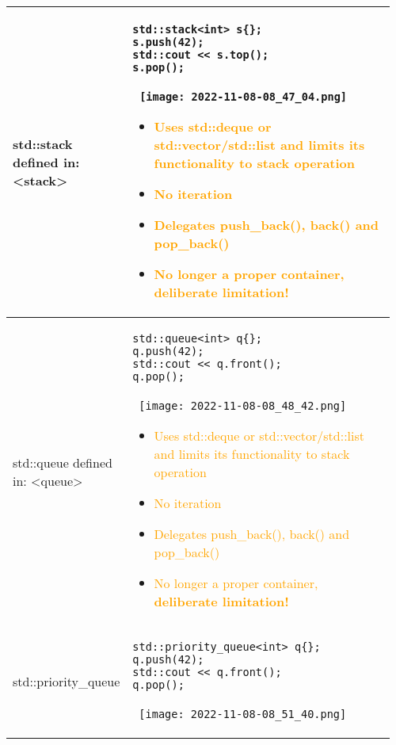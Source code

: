 \documentclass[main.tex,fontsize=8pt,paper=a4,paper=portrait,DIV=calc,]{scrartcl}
\begin{document}
\begin{table}[ht!]
\begin{tabular}{|m{0.2\linewidth}|m{0.755\linewidth}|}
\hline
std::stack \newline 
defined in: <stack> & 
\begin{lstlisting}
std::stack<int> s{};
s.push(42);
std::cout << s.top();
s.pop();
\end{lstlisting}
\, \newline
\texttt{[image: 2022-11-08-08\_47\_04.png]}\newline
\begin{itemize}
\item \textcolor{orange}{Uses std::deque or std::vector/std::list and limits its functionality to stack operation}
\item \textcolor{orange}{No iteration}
\item \textcolor{orange}{Delegates push\_back(), back() and pop\_back()}
\item \textcolor{orange}{No longer a proper container, \textbf{deliberate limitation!}}
\vspace{-2mm}
\end{itemize}\\
\hline
std::queue  \newline 
defined in: <queue> & 
\begin{lstlisting}
std::queue<int> q{};
q.push(42);
std::cout << q.front();
q.pop();
\end{lstlisting}
\, \newline
\texttt{[image: 2022-11-08-08\_48\_42.png]}\newline
\begin{itemize}
\item \textcolor{orange}{Uses std::deque or std::vector/std::list and limits its functionality to stack operation}
\item \textcolor{orange}{No iteration}
\item \textcolor{orange}{Delegates push\_back(), back() and pop\_back()}
\item \textcolor{orange}{No longer a proper container, \textbf{deliberate limitation!}}
\vspace{-2mm}
\end{itemize}\\
\hline
std::priority\_queue & 
\begin{lstlisting}
std::priority_queue<int> q{};
q.push(42);
std::cout << q.front();
q.pop();
\end{lstlisting}
\, \newline
\texttt{[image: 2022-11-08-08\_51\_40.png]}\newline
\begin{itemize}

\end{itemize}
\end{tabular}
\end{table}
\end{document}
